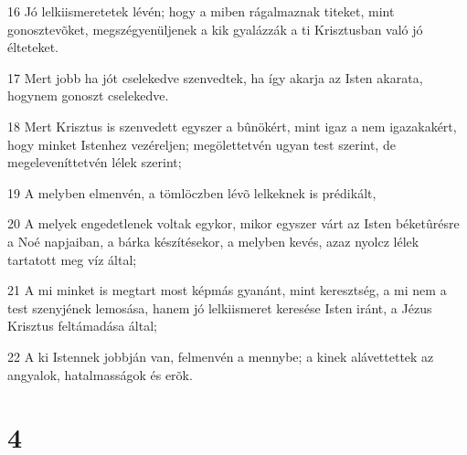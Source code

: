 \par 16 Jó lelkiismeretetek lévén; hogy a miben rágalmaznak titeket, mint gonosztevõket, megszégyenüljenek a kik gyalázzák a ti Krisztusban való jó élteteket.
\par 17 Mert jobb ha jót cselekedve szenvedtek, ha így akarja az Isten akarata, hogynem gonoszt cselekedve.
\par 18 Mert Krisztus is szenvedett egyszer a bûnökért, mint igaz a nem igazakakért, hogy minket Istenhez vezéreljen; megölettetvén ugyan test szerint, de megeleveníttetvén lélek szerint;
\par 19 A melyben elmenvén, a tömlöczben lévõ lelkeknek is prédikált,
\par 20 A melyek engedetlenek voltak egykor, mikor egyszer várt az Isten béketûrésre a Noé napjaiban, a bárka készítésekor, a melyben kevés, azaz nyolcz lélek tartatott meg víz által;
\par 21 A mi minket is megtart most képmás gyanánt, mint keresztség, a mi nem a test szenyjének lemosása, hanem jó lelkiismeret keresése Isten iránt, a Jézus Krisztus feltámadása által;
\par 22 A ki Istennek jobbján van, felmenvén a mennybe; a kinek alávettettek az angyalok, hatalmasságok és erõk.

\chapter{4}

